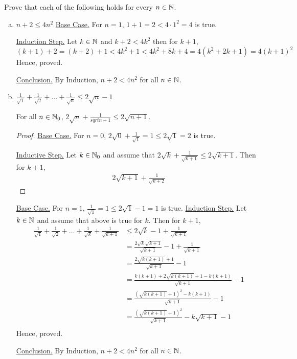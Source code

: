 \bp
Prove that each of the following holds for every $n \in \mathbb{N}$.
\begin{enumerate}[(a).]
	\item $n + 2 \leq 4n^2$
		\bs
		\underline{Base Case.} For $n = 1$, $1 + 1 = 2 < 4 \cdot 1^2 = 4$ is true.

		\underline{Induction Step.} Let $k \in \mathbb{N}$ and $k+2 < 4k^2$ then for $k+1$, 
		$$(k+1)+2 = (k+2)+1 < 4k^2 + 1 < 4k^2 + 8k + 4 = 4(k^2 + 2k + 1) = 4(k+1)^2$$
		Hence, proved.
		
		\underline{Conclusion.} By Induction, $n+2 < 4n^2$ for all $n \in \mathbb{N}$.
		\es

	\item $\displaystyle \frac{1}{\sqrt{1}} + \frac{1}{\sqrt{2}} + \ldots + \frac{1}{\sqrt{n}} \leq 2 \sqrt{n} - 1$
		\bs
		\begin{lemma}\label{sql}
			For all $n \in \mathbb{N}_0$, $2 \sqrt{n} + \frac{1}{sqrt{n+1}} \leq 2 \sqrt{n+1}$.
		\end{lemma}
		\begin{proof}
			\underline{Base Case.} For $n = 0$, $2\sqrt{0}+\frac{1}{\sqrt{1}} = 1 \leq 2 \sqrt{1} = 2$ is true.

			\underline{Inductive Step.} Let $k \in \mathbb{N}_0$ and assume that $2 \sqrt{k} + \frac{1}{\sqrt{k+1}} \leq 2 \sqrt{k+1}$. Then for $k+1$,
			\begin{align*}
				2 \sqrt{k+1} + \frac{1}{\sqrt{k+2}}
			\end{align*}
		\end{proof}

		\underline{Base Case.} For $n = 1$, $\frac{1}{\sqrt{1}} = 1 \leq 2 \sqrt{1} - 1 = 1$ is true.
		\underline{Induction Step.} Let $k \in \mathbb{N}$ and assume that above is true for $k$. Then for $k+1$, 
		\begin{align*}
			\frac{1}{\sqrt{1}} + \frac{1}{\sqrt{2}} + \ldots + \frac{1}{\sqrt{k}} + \frac{1}{\sqrt{k+1}} 
				& \leq 2 \sqrt{k} - 1 + \frac{1}{\sqrt{k+1}} \\
				&= \frac{2 \sqrt{k} \sqrt{k+1}}{\sqrt{k+1}} - 1 + \frac{1}{\sqrt{k+1}} \\
				&= \frac{2 \sqrt{k(k+1)} + 1}{\sqrt{k+1}} - 1 \\
				&= \frac{k(k+1) + 2 \sqrt{k(k+1)} + 1 - k(k+1)}{\sqrt{k+1}} - 1 \\
				&= \frac{(\sqrt{k(k+1)}+1)^2 - k(k+1)}{\sqrt{k+1}} - 1 \\
				&= \frac{(\sqrt{k(k+1)}+1)^2}{\sqrt{k+1}} - k \sqrt{k+1} - 1 \\
		\end{align*}
		Hence, proved.
		
		\underline{Conclusion.} By Induction, $n+2 < 4n^2$ for all $n \in \mathbb{N}$.
		\es
\end{enumerate}
\ep
